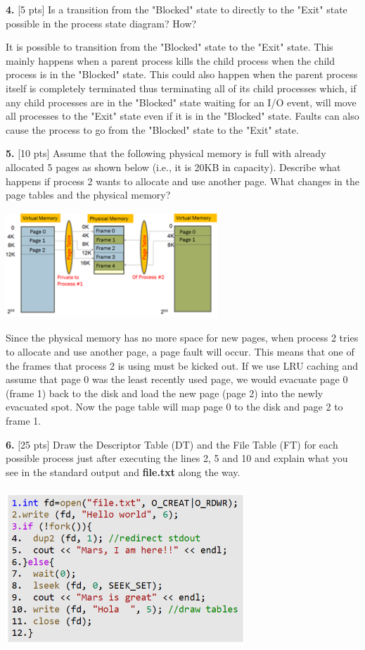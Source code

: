 \documentclass[12pt]{article}
\begin{document}
{\bf 4.} [5 pts] Is a transition from the "Blocked" state to directly to the "Exit" state possible in the process state diagram? How?

It is possible to transition from the "Blocked" state to the "Exit" state. This mainly happens when a parent process kills the child process when the child process is in the "Blocked" state. This could also happen when the parent process itself is completely terminated thus terminating all of its child processes which, if any child processes are in the "Blocked" state waiting for an I/O event, will move all processes to the "Exit" state even if it is in the "Blocked" state. Faults can also cause the process to go from the "Blocked" state to the "Exit" state. 

{\bf 5.} [10 pts] Assume that the following physical memory is full with already allocated 5 pages as shown below (i.e., it is 20KB in capacity). Describe what happens if process 2 wants to allocate and use another page. What changes in the page tables and the physical memory? 

\begin{center}
\includegraphics[width=8cm, height=4cm]{313Quiz2P5}
\end{center}

Since the physical memory has no more space for new pages, when process 2 tries to allocate and use another page, a page fault will occur. This means that one of the frames that process 2 is using must be kicked out. If we use LRU caching and assume that page 0 was the least recently used page, we would evacuate page 0 (frame 1) back to the disk and load the new page (page 2) into the newly evacuated spot. Now the page table will map page 0 to the disk and page 2 to frame 1. 

{\bf 6.} [25 pts] Draw the Descriptor Table (DT) and the File Table (FT) for each possible process just after executing the lines 2, 5 and 10 and explain what you see in the standard output and {\bf file.txt} along the way. 

\begin{center}
\includegraphics[width=9cm, height=6cm]{P6}
\end{center}
\end{document}
